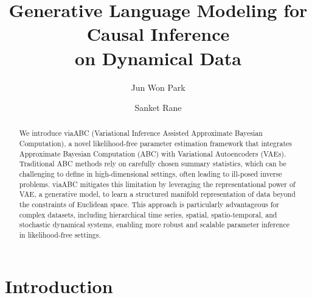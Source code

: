 \documentclass[12pt]{article} %
\begin{document}
\title{Generative Language Modeling for Causal Inference\\ on Dynamical Data}
\author[1]{Jun Won Park}
\author[1]{Sanket Rane}

\maketitle
%
%
%
%
%
\begin{abstract}
We introduce viaABC (Variational Inference Assisted Approximate Bayesian Computation), a novel likelihood-free parameter estimation framework that integrates Approximate Bayesian Computation (ABC) with Variational Autoencoders (VAEs). Traditional ABC methods rely on carefully chosen summary statistics, which can be challenging to define in high-dimensional settings, often leading to ill-posed inverse problems. viaABC mitigates this limitation by leveraging the representational power of VAE, a generative model, to learn a structured manifold representation of data beyond the constraints of Euclidean space. This approach is particularly advantageous for complex datasets, including hierarchical time series, spatial, spatio-temporal, and stochastic dynamical systems, enabling more robust and scalable parameter inference in likelihood-free settings.
\end{abstract}

\section{Introduction}
\end{document}

